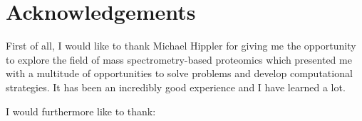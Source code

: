 \cleardoublepage
\chapter*{Acknowledgements}

First of all, I would like to thank
Michael Hippler for giving me the opportunity to explore the field of
mass spectrometry-based proteomics which presented me with a multitude
of opportunities to solve problems and develop computational strategies.
It has been an incredibly good experience and I have learned a lot.

I would furthermore like to thank:

